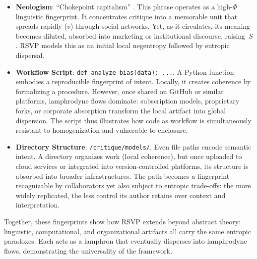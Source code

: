 \documentclass{article}
\begin{document}
{\begin{itemize}
    \item \textbf{Neologism}: ``Chokepoint capitalism'' \cite{giblin2022chokepoint}.  
    This phrase operates as a high-$\Phi$ linguistic fingerprint. It concentrates critique into a memorable unit that spreads rapidly ($v$) through social networks. Yet, as it circulates, its meaning becomes diluted, absorbed into marketing or institutional discourse, raising~$S$. RSVP models this as an initial local negentropy followed by entropic dispersal.
    
    \item \textbf{Workflow Script}: \texttt{def analyze\_bias(data): ...}.  
    A Python function embodies a reproducible fingerprint of intent. Locally, it creates coherence by formalizing a procedure. However, once shared on GitHub or similar platforms, lamphrodyne flows dominate: subscription models, proprietary forks, or corporate absorption transform the local artifact into global dispersion. The script thus illustrates how code as workflow is simultaneously resistant to homogenization and vulnerable to enclosure.
    
    \item \textbf{Directory Structure}: \texttt{/critique/models/}.  
    Even file paths encode semantic intent. A directory organizes work (local coherence), but once uploaded to cloud services or integrated into version-controlled platforms, its structure is absorbed into broader infrastructures. The path becomes a fingerprint recognizable by collaborators yet also subject to entropic trade-offs: the more widely replicated, the less control its author retains over context and interpretation.
\end{itemize}

Together, these fingerprints show how RSVP extends beyond abstract theory: linguistic, computational, and organizational artifacts all carry the same entropic paradoxes. Each acts as a lamphron that eventually disperses into lamphrodyne flows, demonstrating the universality of the framework.

}
\end{document}
